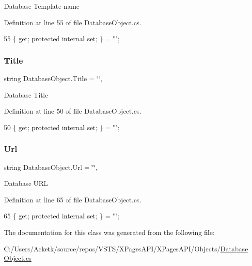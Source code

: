 Database Template name 



Definition at line 55 of file Database\+Object.\+cs.


\begin{DoxyCode}
55 \{ \textcolor{keyword}{get}; \textcolor{keyword}{protected} \textcolor{keyword}{internal} \textcolor{keyword}{set}; \} = \textcolor{stringliteral}{""};
\end{DoxyCode}
\mbox{\label{class_database_object_a9af3f75274dd39f7fa82a355dc4ddf39}} 
\subsubsection{\texorpdfstring{Title}{Title}}
{\footnotesize\ttfamily string Database\+Object.\+Title = \char`\"{}\char`\"{}\hspace{0.3cm}{\ttfamily [get]}, {\ttfamily [set]}}



Database Title 



Definition at line 50 of file Database\+Object.\+cs.


\begin{DoxyCode}
50 \{ \textcolor{keyword}{get}; \textcolor{keyword}{protected} \textcolor{keyword}{internal} \textcolor{keyword}{set}; \} = \textcolor{stringliteral}{""};
\end{DoxyCode}
\mbox{\label{class_database_object_a12da011e3dc03d3a10ac86df10c84f48}} 
\subsubsection{\texorpdfstring{Url}{Url}}
{\footnotesize\ttfamily string Database\+Object.\+Url = \char`\"{}\char`\"{}\hspace{0.3cm}{\ttfamily [get]}, {\ttfamily [set]}}



Database U\+RL 



Definition at line 65 of file Database\+Object.\+cs.


\begin{DoxyCode}
65 \{ \textcolor{keyword}{get}; \textcolor{keyword}{protected} \textcolor{keyword}{internal} \textcolor{keyword}{set}; \} = \textcolor{stringliteral}{""};
\end{DoxyCode}


The documentation for this class was generated from the following file\+:\begin{DoxyCompactItemize}
\item 
C\+:/\+Users/\+Acketk/source/repos/\+V\+S\+T\+S/\+X\+Pages\+A\+P\+I/\+X\+Pages\+A\+P\+I/\+Objects/\mbox{\hyperlink{_database_object_8cs}{Database\+Object.\+cs}}\end{DoxyCompactItemize}
